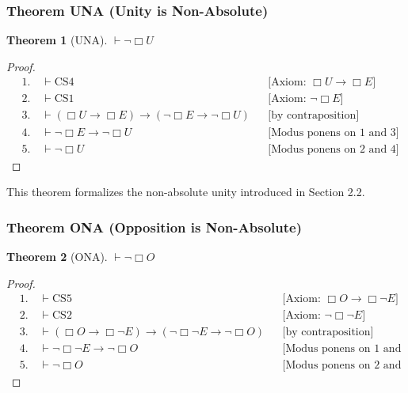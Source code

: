 \documentclass[11pt,a4paper]{article}
\newtheorem{theorem}{Theorem}
\theoremstyle{definition}
\theoremstyle{remark}
\begin{document}
\subsubsection{Theorem UNA (Unity is Non-Absolute)}

\begin{theorem}[UNA]
$\vdash \neg\Box U$
\end{theorem}

\begin{proof}
\begin{align}
&1. \quad \vdash \text{CS4} && \text{[Axiom: } \Box U \to \Box E\text{]} \\
&2. \quad \vdash \text{CS1} && \text{[Axiom: } \neg\Box E\text{]} \\
&3. \quad \vdash (\Box U \to \Box E) \to (\neg\Box E \to \neg\Box U) && \text{[by contraposition]} \\
&4. \quad \vdash \neg\Box E \to \neg\Box U && \text{[Modus ponens on 1 and 3]} \\
&5. \quad \vdash \neg\Box U && \text{[Modus ponens on 2 and 4]}
\end{align}
\end{proof}

This theorem formalizes the non-absolute unity introduced in Section 2.2.

\subsubsection{Theorem ONA (Opposition is Non-Absolute)}

\begin{theorem}[ONA]
$\vdash \neg\Box O$
\end{theorem}

\begin{proof}
\begin{align}
&1. \quad \vdash \text{CS5} && \text{[Axiom: } \Box O \to \Box\neg E\text{]} \\
&2. \quad \vdash \text{CS2} && \text{[Axiom: } \neg\Box\neg E\text{]} \\
&3. \quad \vdash (\Box O \to \Box\neg E) \to (\neg\Box\neg E \to \neg\Box O) && \text{[by contraposition]} \\
&4. \quad \vdash \neg\Box\neg E \to \neg\Box O && \text{[Modus ponens on 1 and 3]} \\
&5. \quad \vdash \neg\Box O && \text{[Modus ponens on 2 and 4]}
\end{align}
\end{proof}
\end{document}

